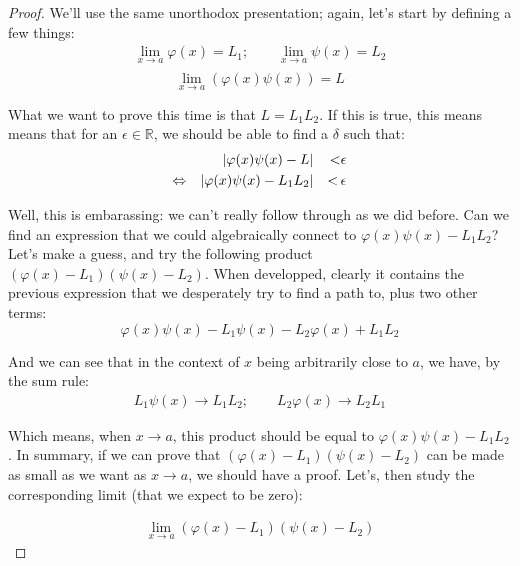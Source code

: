 \documentclass[solutions.tex]{subfiles}
\begin{document}
\begin{proof} We'll use the same unorthodox presentation; again,
let's start by defining a few things:
\begin{equation*} \begin{aligned}
	\lim_{x \rightarrow a}\varphi(x) = L_1;\qquad\lim_{x \rightarrow a}\psi(x) = L_2 \\
\end{aligned} \end{equation*}
\[	\lim_{x \rightarrow a}\left(\varphi(x)\psi(x)\right) = L \]

What we want to prove this time is that $L = L_1L_2$. If this
is true, this means means that for an $\epsilon\in\mathbb{R}$, we
should be able to find a $\delta$ such that:
\begin{equation*} \begin{aligned}
	~ && \lvert \varphi(x)\psi(x)-L \rvert &&<& \epsilon \\
	\Leftrightarrow && \lvert \varphi(x)\psi(x)-L_1L_2 \rvert &&<\,& \epsilon
\end{aligned} \end{equation*}

Well, this is embarassing: we can't really follow through as we did
before. Can we find an expression that we could algebraically connect
to $\varphi(x)\psi(x)-L_1L_2$? \\

Let's make a guess, and try the following product $(\varphi(x)-L_1)(\psi(x)-L_2)$.
When developped, clearly it contains the previous expression that
we desperately try to find a path to, plus two other terms:
\[
	\varphi(x)\psi(x)-L_1\psi(x)-L_2\varphi(x)+L_1L_2
\]

And we can see that in the context of $x$ being arbitrarily close
to $a$, we have, by the sum rule:
\begin{equation*} \begin{aligned}
	L_1\psi(x) \rightarrow L_1L_2;\qquad L_2\varphi(x) \rightarrow L_2L_1
\end{aligned} \end{equation*}

Which means, when $x\rightarrow a$, this product should be equal to
$\varphi(x)\psi(x)-L_1L_2$. In summary, if we can prove that
$(\varphi(x)-L_1)(\psi(x)-L_2)$ can be made as small as we want as
$x\rightarrow a$, we should have a proof. Let's, then study the
corresponding limit (that we expect to be zero):

\begin{equation*} \begin{aligned}
	\lim_{x\rightarrow a}(\varphi(x)-L_1)(\psi(x)-L_2)
\end{aligned} \end{equation*}


\end{proof}
\end{document}
